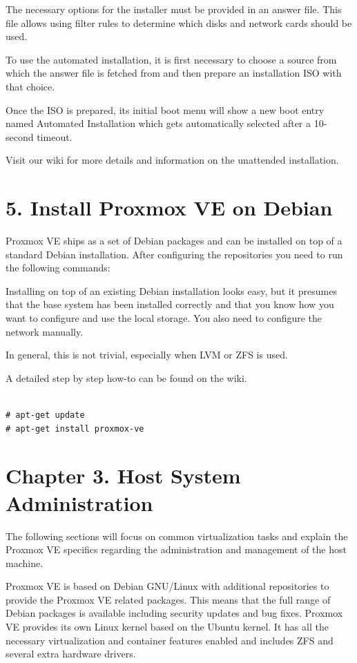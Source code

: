 The necessary options for the installer must be provided in an answer file. This file allows using filter rules to determine which disks and network cards should be used.

To use the automated installation, it is first necessary to choose a source from which the answer file is fetched from and then prepare an installation ISO with that choice.

Once the ISO is prepared, its initial boot menu will show a new boot entry named Automated Installation which gets automatically selected after a 10-second timeout.

Visit our wiki for more details and information on the unattended installation.


\section{5. Install Proxmox VE on Debian}

Proxmox VE ships as a set of Debian packages and can be installed on top of a standard Debian installation. After configuring the repositories you need to run the following commands:

Installing on top of an existing Debian installation looks easy, but it presumes that the base system has been installed correctly and that you know how you want to configure and use the local storage. You also need to configure the network manually.

In general, this is not trivial, especially when LVM or ZFS is used.

A detailed step by step how-to can be found on the wiki.

\begin{lstlisting}

# apt-get update
# apt-get install proxmox-ve

\end{lstlisting}


\section{Chapter 3. Host System Administration}

The following sections will focus on common virtualization tasks and explain the Proxmox VE specifics regarding the administration and management of the host machine.

Proxmox VE is based on Debian GNU/Linux with additional repositories to provide the Proxmox VE related packages. This means that the full range of Debian packages is available including security updates and bug fixes. Proxmox VE provides its own Linux kernel based on the Ubuntu kernel. It has all the necessary virtualization and container features enabled and includes ZFS and several extra hardware drivers.

